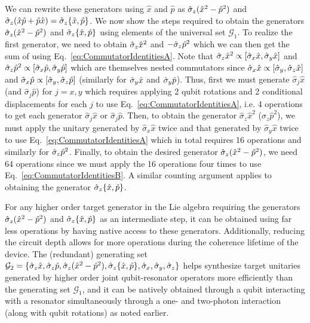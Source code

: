 {We can rewrite these generators using $\hat{x}$ and $\hat{p}$ as $\hat{\sigma}_z(\hat{x}^2 - \hat{p}^2)$ and $\hat{\sigma}_z(\hat{x}\hat{p} +\hat{p}\hat{x})=\hat{\sigma}_z\{\hat{x},\hat{p}\}$. We now show the steps required  to obtain the generators $\hat{\sigma}_z(\hat{x}^2 -\hat{p}^2)$ and $\hat{\sigma}_z\{\hat{x},\hat{p}\}$ using elements of the universal set $\mathcal{G}_1$. To realize the first generator, we need to obtain $\hat{\sigma}_z\hat{x}^2$ and $-\hat{\sigma}_z\hat{p}^2$ which we can then get the sum of using Eq.~\eqref{eq:CommutatorIdentitiesA}. Note that $\hat{\sigma}_z\hat{x}^2\propto [\hat{\sigma}_x\hat{x},\hat{\sigma}_y\hat{x}]$ and $\hat{\sigma}_z\hat{p}^2\propto [\hat{\sigma}_x\hat{p},\hat{\sigma}_y\hat{p}]$ which are themselves nested commutators since $\hat{\sigma}_x\hat{x}\propto [\hat{\sigma}_y,\hat{\sigma}_z\hat{x}]$ and $\hat{\sigma}_x\hat{p}\propto [\hat{\sigma}_y,\hat{\sigma}_z\hat{p}]$ (similarly for $\hat{\sigma}_y\hat{x}$ and $\hat{\sigma}_y\hat{p}$). Thus, first we must generate $\hat{\sigma}_j \hat{x}$ (and $\hat{\sigma}_j \hat{p}$) for $j=x,y$ which requires applying 2 qubit rotations and 2 conditional displacements for each $j$ to use Eq.~\eqref{eq:CommutatorIdentitiesA}, i.e. 4 operations to get each generator $\hat{\sigma}_j \hat{x}$ or $\hat{\sigma}_j \hat{p}$. Then, to obtain the generator $\hat{\sigma}_z \hat{x}^2$ ($\hat{\sigma}_z \hat{p}^2$), we must apply the unitary generated by $\hat{\sigma}_x \hat{x}$ twice and that generated by $\hat{\sigma}_y \hat{x}$ twice to use Eq.~\eqref{eq:CommutatorIdentitiesA} which in total requires 16 operations and similarly for $\hat{\sigma}_z\hat{p}^2$. Finally, to obtain the desired generator $\hat{\sigma}_z(\hat{x}^2 -\hat{p}^2)$, we need 64 operations since we must apply the 16 operations four times to use Eq.~\eqref{eq:CommutatorIdentitiesB}. A similar counting argument applies to obtaining the generator $\hat{\sigma}_z\{\hat{x},\hat{p}\}$.}
 
 {For any higher order target generator in the Lie algebra requiring the generators $\hat{\sigma}_z(\hat{x}^2 -\hat{p}^2)$ and $\hat{\sigma}_z\{\hat{x},\hat{p}\}$ as an intermediate step, it can be obtained using far less operations by having native access to these generators.  Additionally, reducing the circuit depth allows for more operations during the coherence lifetime of the device. The (redundant) generating set $\mathcal{G}_2=\{\hat{\sigma}_z \hat{x}, \hat{\sigma}_z \hat{p},\hat{\sigma}_z(\hat{x}^2 -\hat{p}^2),\hat{\sigma}_z\{\hat{x},\hat{p}\},\hat{\sigma}_x,\hat{\sigma}_y,\hat{\sigma}_z  \}$ helps synthesize target unitaries generated by higher order joint qubit-resonator operators more efficiently than the generating set $\mathcal{G}_1$, and it can be natively obtained through a qubit interacting with a resonator simultaneously through a one- and two-photon interaction (along with qubit rotations) as noted earlier.}
 \\

